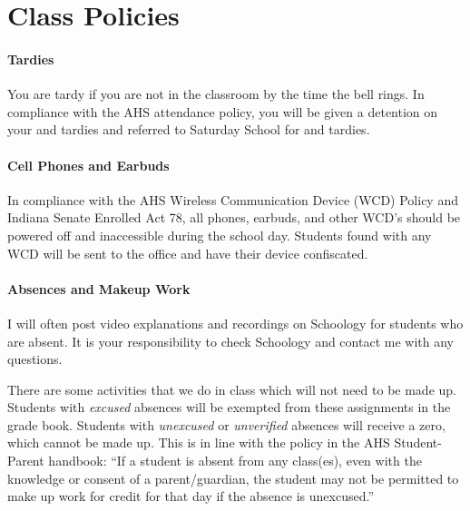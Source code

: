 \documentclass[10pt]{exam}
\begin{document}
\section*{Class Policies}

	\paragraph{Tardies}
		You are tardy if you are not in the classroom by the time the bell rings.  In compliance with the AHS attendance policy, you will be given a detention on your  and  tardies and referred to Saturday School for  and  tardies.
	
	\paragraph{Cell Phones and Earbuds}
		In compliance with the AHS Wireless Communication Device (WCD) Policy and Indiana Senate Enrolled Act 78, all phones, earbuds, and other WCD's should be powered off and inaccessible during the school day.  Students found with any WCD will be sent to the office and have their device confiscated.
	
	\paragraph{Absences and Makeup Work}
		I will often post video explanations and recordings  on Schoology for students who are absent.  It is your responsibility to check Schoology and contact me with any questions.
	
		There are some activities that we do in class which will not need to be made up.  Students with \emph{excused} absences will be exempted from these assignments in the grade book.  Students with \emph{unexcused} or \emph{unverified} absences will receive a zero, which cannot be made up.  This is in line with the policy in the AHS Student-Parent handbook: ``If a student is absent from any class(es), even with the knowledge or consent of a parent/guardian, the student may not be permitted to make up work for credit for that day if the absence is unexcused.''
	
\end{document}
